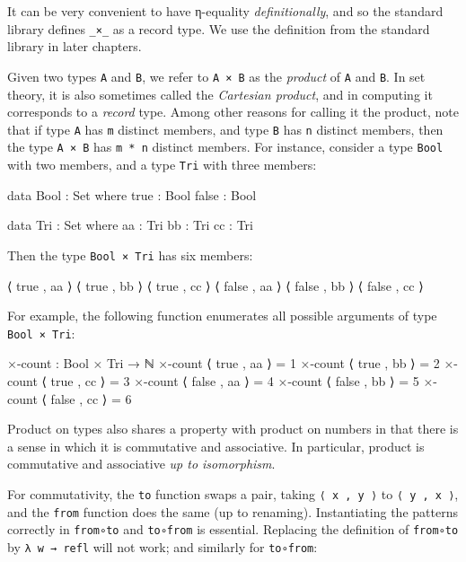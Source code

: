 It can be very convenient to have η-equality \emph{definitionally}, and
so the standard library defines \texttt{\_×\_} as a record type. We use
the definition from the standard library in later chapters.

Given two types \texttt{A} and \texttt{B}, we refer to \texttt{A\ ×\ B}
as the \emph{product} of \texttt{A} and \texttt{B}. In set theory, it is
also sometimes called the \emph{Cartesian product}, and in computing it
corresponds to a \emph{record} type. Among other reasons for calling it
the product, note that if type \texttt{A} has \texttt{m} distinct
members, and type \texttt{B} has \texttt{n} distinct members, then the
type \texttt{A\ ×\ B} has \texttt{m\ *\ n} distinct members. For
instance, consider a type \texttt{Bool} with two members, and a type
\texttt{Tri} with three members:

\begin{fence}
\begin{code}
data Bool : Set where
  true  : Bool
  false : Bool

data Tri : Set where
  aa : Tri
  bb : Tri
  cc : Tri
\end{code}
\end{fence}

Then the type \texttt{Bool\ ×\ Tri} has six members:

\begin{myDisplay}
⟨ true  , aa ⟩    ⟨ true  , bb ⟩    ⟨ true ,  cc ⟩
⟨ false , aa ⟩    ⟨ false , bb ⟩    ⟨ false , cc ⟩
\end{myDisplay}

For example, the following function enumerates all possible arguments of
type \texttt{Bool\ ×\ Tri}:

\begin{fence}
\begin{code}
×-count : Bool × Tri → ℕ
×-count ⟨ true  , aa ⟩  =  1
×-count ⟨ true  , bb ⟩  =  2
×-count ⟨ true  , cc ⟩  =  3
×-count ⟨ false , aa ⟩  =  4
×-count ⟨ false , bb ⟩  =  5
×-count ⟨ false , cc ⟩  =  6
\end{code}
\end{fence}

Product on types also shares a property with product on numbers in that
there is a sense in which it is commutative and associative. In
particular, product is commutative and associative \emph{up to
isomorphism}.

For commutativity, the \texttt{to} function swaps a pair, taking
\texttt{⟨\ x\ ,\ y\ ⟩} to \texttt{⟨\ y\ ,\ x\ ⟩}, and the \texttt{from}
function does the same (up to renaming). Instantiating the patterns
correctly in \texttt{from∘to} and \texttt{to∘from} is essential.
Replacing the definition of \texttt{from∘to} by \texttt{λ\ w\ →\ refl}
will not work; and similarly for \texttt{to∘from}:

